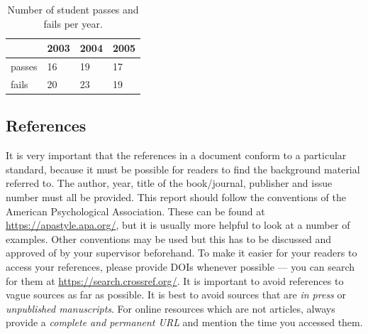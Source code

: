\begin{table}[h]
  \centering
  \caption{Number of student passes and fails per year.}\label{tab:some_table}
  \begin{tabular}{llll}
    \toprule
    & 2003 & 2004 & 2005 \\
    \midrule
    passes & 16 & 19 & 17 \\
    fails & 20 & 23 & 19 \\
    \bottomrule
  \end{tabular}
\end{table}

\subsection{References}\label{sec:_references}
It is very important that the references in a document conform to a particular standard, because it must be possible for readers to find the background material referred to.
The author, year, title of the book/journal, publisher and issue number must all be provided.
This report should follow the conventions of the American Psychological Association.
These can be found at \url{https://apastyle.apa.org/}, but it is usually more helpful to look at a number of examples.
Other conventions may be used but this has to be discussed and approved of by your supervisor beforehand.
To make it easier for your readers to access your references, please provide DOIs whenever possible --- you can search for them at \url{https://search.crossref.org/}.
It is important to avoid references to vague sources as far as possible.
It is best to avoid sources that are \emph{in press} or \emph{unpublished manuscripts}.
For online resources which are not articles, always provide a \emph{complete and permanent URL} and mention the time you accessed them.
